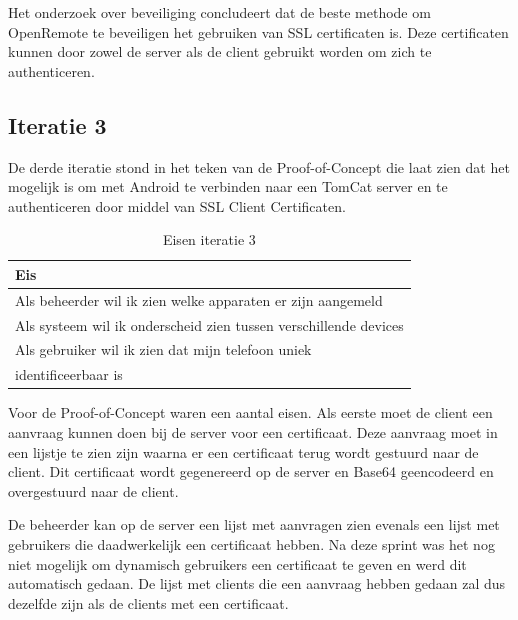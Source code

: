 \documentclass[]{article}
\begin{document}
Het onderzoek over beveiliging concludeert dat de beste methode om
OpenRemote te beveiligen het gebruiken van SSL certificaten is. Deze
certificaten kunnen door zowel de server als de client gebruikt worden om
zich te authenticeren.

\subsection{Iteratie 3}
De derde iteratie stond in het teken van de Proof-of-Concept die laat zien
dat het mogelijk is om met Android te verbinden naar een TomCat server en
te authenticeren door middel van SSL Client Certificaten.

\begin{table}[htpb]
  \caption{Eisen iteratie 3}
  \begin{center}
    \begin{tabular}{|| l ||}\hline
        Eis                                                              \\\hline\hline
        Als beheerder wil ik zien welke apparaten er zijn aangemeld      \\\hline
        Als systeem wil ik onderscheid zien tussen verschillende devices \\\hline
        Als gebruiker wil ik zien dat mijn telefoon uniek                \\ 
        identificeerbaar is                                              \\\hline
    \end{tabular}                                                         
  \end{center}                                                            
\end{table}                                                               

Voor de Proof-of-Concept waren een aantal eisen. Als eerste moet de client
een aanvraag kunnen doen bij de server voor een certificaat. Deze aanvraag
moet in een lijstje te zien zijn waarna er een certificaat terug wordt
gestuurd naar de client. Dit certificaat wordt gegenereerd op de server en
Base64 geencodeerd en overgestuurd naar de client.

De beheerder kan op de server een lijst met aanvragen zien evenals een
lijst met gebruikers die daadwerkelijk een certificaat hebben. Na deze
sprint was het nog niet mogelijk om dynamisch gebruikers een certificaat te
geven en werd dit automatisch gedaan. De lijst met clients die een aanvraag
hebben gedaan zal dus dezelfde zijn als de clients met een certificaat.
\end{document}
